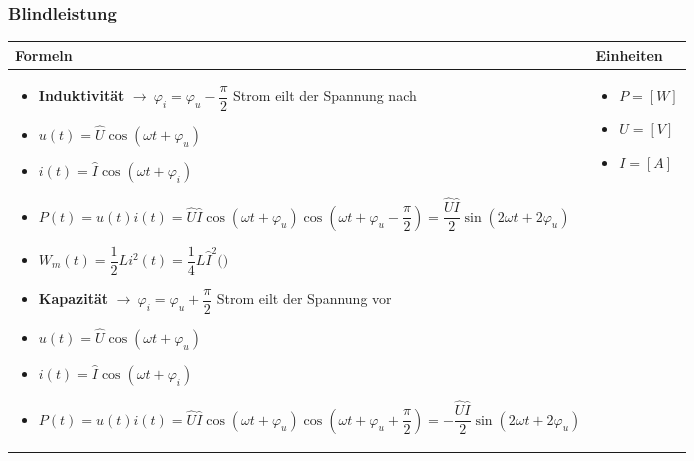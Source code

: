 \subsubsection{Blindleistung}
\begin{tabular}{ | m{15cm} | m{3cm}  | }
	\hline
	Formeln & Einheiten \\ \hline
	\hline
	\begin{itemize}
		\item \textbf{Induktivität} $\rightarrow\ \varphi_i=\varphi_u-\dfrac{\pi}{2}$ Strom eilt der Spannung nach
		\item[] $u(t)=\hat{U}\cos(\omega t+\varphi_u)$
		\item[] $i(t)=\hat{I}\cos(\omega t+\varphi_i)$
		\item[] $P(t)=u(t)i(t)=\hat{U}\hat{I}\cos(\omega t+\varphi_u)\cos(\omega t+\varphi_u-\dfrac{\pi}{2})=\dfrac{\hat{U}\hat{I}}{2}\sin(2\omega t+2\varphi_u)$
		\item[] $W_m(t)=\dfrac{1}{2}Li^2(t)=\dfrac{1}{4}L\hat{I}^2\big(\big)$
		\item \textbf{Kapazität} $\rightarrow\ \varphi_i=\varphi_u+\dfrac{\pi}{2}$ Strom eilt der Spannung vor
		\item[] $u(t)=\hat{U}\cos(\omega t+\varphi_u)$
		\item[] $i(t)=\hat{I}\cos(\omega t+\varphi_i)$
		\item[] $P(t)=u(t)i(t)=\hat{U}\hat{I}\cos(\omega t+\varphi_u)\cos(\omega t+\varphi_u+\dfrac{\pi}{2})=-\dfrac{\hat{U}\hat{I}}{2}\sin(2\omega t+2\varphi_u)$
	\end{itemize}
	&
	\begin{itemize}
		\item[] $P=[W]$
		\item[] $U=[V]$
		\item[] $I=[A]$
	\end{itemize}   	
	\\ \hline
\end{tabular}

